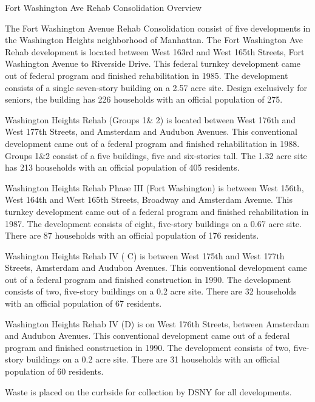Fort Washington Ave Rehab Consolidation Overview

The Fort Washington Avenue Rehab Consolidation consist of five developments in the Washington Heights neighborhood of Manhattan. The Fort Washington Ave Rehab development is located between West 163rd and West 165th Streets, Fort Washington Avenue to Riverside Drive. This federal turnkey development came out of federal program and finished rehabilitation in 1985. The development consists of a single seven-story building on a 2.57 acre site. Design exclusively for seniors, the building has 226 households with an official population of 275.

Washington Heights Rehab (Groups 1& 2) is located between West 176th and West 177th Streets, and Amsterdam and Audubon Avenues. This conventional development came out of a federal program and finished rehabilitation in 1988. Groups 1&2 consist of a five buildings, five and six-stories tall. The 1.32 acre site has 213 households with an official population of 405 residents.

Washington Heights Rehab Phase III (Fort Washington) is between West 156th, West 164th and West 165th Streets, Broadway and Amsterdam Avenue. This turnkey development came out of a federal program and finished rehabilitation in 1987. The development consists of eight, five-story buildings on a 0.67 acre site. There are 87 households with an official population of 176 residents.

Washington Heights Rehab IV ( C) is between West 175th and West 177th Streets, Amsterdam and Audubon Avenues. This conventional development came out of a federal program and finished construction in 1990. The development consists of two, five-story buildings on a 0.2 acre site. There are 32 households with an official population of 67 residents.

Washington Heights Rehab IV (D) is on West 176th Streets, between Amsterdam and Audubon Avenues. This conventional development came out of a federal program and finished construction in 1990. The development consists of two, five-story buildings on a 0.2 acre site. There are 31 households with an official population of 60 residents.

Waste is placed on the curbside for collection by DSNY for all developments.